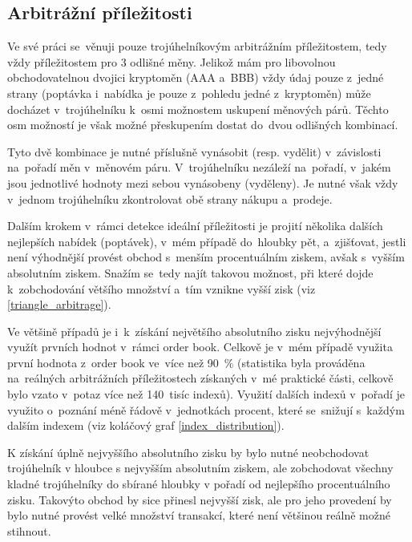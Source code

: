 \documentclass[thesis=B,czech]{FITthesis}[2019/03/21]
\begin{document}
\subsection{Arbitrážní příležitosti}
Ve své práci se~věnuji pouze trojúhelníkovým arbitrážním příležitostem, tedy vždy příležitostem pro 3 odlišné měny. Jelikož mám pro libovolnou obchodovatelnou dvojici kryptoměn (AAA a~BBB) vždy údaj pouze z~jedné strany (poptávka i~nabídka je pouze z~pohledu jedné z~kryptoměn) může docházet v~trojúhelníku k~osmi možnostem uskupení měnových párů. Těchto osm \linebreak možností je však možné přeskupením dostat do~dvou odlišných kombinací.

Tyto dvě kombinace je nutné příslušně vynásobit (resp. vydělit) v~závislosti na~pořadí měn v~měnovém páru. V~trojúhelníku nezáleží na~pořadí, v~jakém jsou jednotlivé hodnoty mezi sebou vynásobeny (vyděleny). Je nutné však vždy v~jednom trojúhelníku zkontrolovat obě strany nákupu a~prodeje.

Dalším krokem v~rámci detekce ideální příležitosti je projití několika dalších nejlepších nabídek (poptávek), v~mém případě do~hloubky pět, a~zjišťovat, jestli není výhodnější provést obchod s~menším procentuálním ziskem, avšak s~vyšším absolutním ziskem. Snažím se~tedy najít takovou možnost, při které dojde k~zobchodování většího množství a~tím vznikne vyšší zisk (viz \ref{triangle_arbitrage}).

Ve většině případů je i~k~získání největšího absolutního zisku nejvýhodnější využít prvních hodnot v~rámci order book. Celkově je v~mém případě využita první hodnota z~order book ve~více než 90~\% (statistika byla prováděna na~reálných arbitrážních příležitostech získaných v~mé praktické části, celkově bylo vzato v~potaz více než 140~tisíc indexů). Využití dalších indexů v~pořadí je využito o~poznání méně řádově v~jednotkách procent, které se~snižují s~každým dalším indexem (viz koláčový graf \ref{index_distribution}).

K získání úplně nejvyššího absolutního zisku by bylo nutné neobchodovat trojúhelník v hloubce s nejvyšším absolutním ziskem, ale zobchodovat všechny kladné trojúhelníky do sbírané hloubky v pořadí od nejlepšího procentuálního zisku. Takovýto obchod by sice přinesl nejvyšší zisk, ale pro jeho provedení by bylo nutné provést velké množství transakcí, které není většinou reálně možné stihnout.
\end{document}
